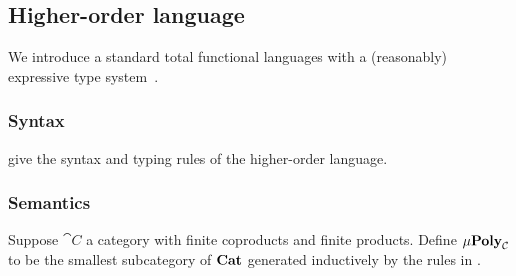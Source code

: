 \subsection{Higher-order language}

We introduce a standard total functional languages with a (reasonably) expressive type
system~\cite{crole94,pitts01,santocanale02}.

\subsubsection{Syntax}





 give the syntax and typing rules of the higher-order language.

\subsubsection{Semantics}

\begin{definition}[$\mu$-polynomial]
Suppose $\cat{C}$ a category with finite coproducts and finite products. Define $\mu\mathbf{Poly}_{\mathcal{C}}$ to be the
smallest subcategory of $\mathbf{Cat}$ generated inductively by the rules in .
\end{definition}


